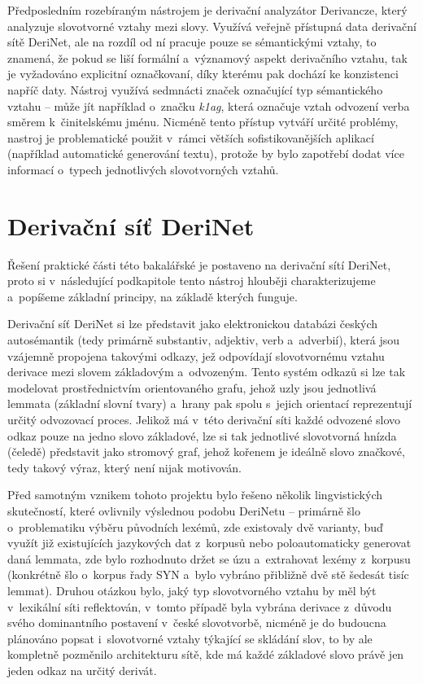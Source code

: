 Předposledním rozebíraným nástrojem je derivační analyzátor Derivancze,
který analyzuje slovotvorné vztahy mezi slovy. Využívá veřejně přístupná
data derivační sítě DeriNet, ale na rozdíl od ní pracuje pouze se
sémantickými vztahy, to znamená, že pokud se liší formální a~významový
aspekt derivačního vztahu, tak je vyžadováno explicitní označkovaní,
díky kterému pak dochází ke konzistenci napříč daty. Nástroj využívá
sedmnácti značek označující typ sémantického vztahu -- může jít
například o~značku \emph{k1ag}, která označuje vztah odvození verba
směrem k~činitelskému jménu. Nicméně tento přístup vytváří určité
problémy, nastroj je problematické použit v~rámci větších
sofistikovanějších aplikací (například automatické generování textu),
protože by bylo zapotřebí dodat více informací o~typech jednotlivých
slovotvorných vztahů.~\parencite{derivancze}

\hypertarget{derivaux10dnuxed-suxedux165-derinet}{%
\section{Derivační síť
DeriNet}\label{derivaux10dnuxed-suxedux165-derinet}}

Řešení praktické části této bakalářské je postaveno na derivační sítí
DeriNet, proto si v~následující podkapitole tento nástroj hlouběji
charakterizujeme a~popíšeme základní principy, na základě kterých
funguje.

Derivační síť DeriNet si lze představit jako elektronickou databázi
českých autosémantik (tedy primárně substantiv, adjektiv, verb
a~adverbií), která jsou vzájemně propojena takovými odkazy, jež odpovídají
slovotvornému vztahu derivace mezi slovem základovým a~odvozeným. Tento
systém odkazů si lze tak modelovat prostřednictvím orientovaného grafu,
jehož uzly jsou jednotlivá lemmata (základní slovní tvary) a~hrany pak
spolu s~jejich orientací reprezentují určitý odvozovací proces. Jelikož
má v~této derivační síti každé odvozené slovo odkaz pouze na jedno slovo
základové, lze si tak jednotlivé slovotvorná hnízda (čeledě) představit
jako stromový graf, jehož kořenem je ideálně slovo značkové, tedy takový
výraz, který není nijak motivován.~\parencite{derinet-cz}

Před samotným vznikem tohoto projektu bylo řešeno několik lingvistických
skutečností, které ovlivnily výslednou podobu DeriNetu -- primárně šlo
o~problematiku výběru původních lexémů, zde existovaly dvě varianty, buď
využít již existujících jazykových dat z~korpusů nebo poloautomaticky
generovat daná lemmata, zde bylo rozhodnuto držet se úzu a~extrahovat
lexémy z~korpusu (konkrétně šlo o~korpus řady SYN a~bylo vybráno
přibližně dvě stě šedesát tisíc lemmat). Druhou otázkou bylo, jaký typ
slovotvorného vztahu by měl být v~lexikální síti reflektován, v~tomto
případě byla vybrána derivace z~důvodu svého dominantního postavení
v~české slovotvorbě, nicméně je do budoucna plánováno popsat i~slovotvorné
vztahy týkající se skládání slov, to by ale kompletně pozměnilo
architekturu sítě, kde má každé základové slovo právě jen jeden odkaz na
určitý derivát.~\parencite{sevcikova14}

